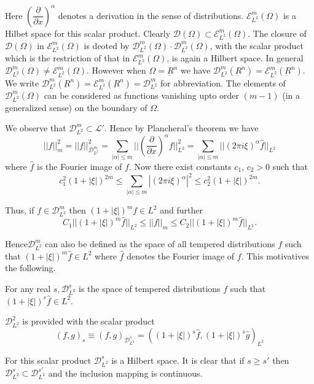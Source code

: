 Here $\left(\dfrac{\partial} {\partial x}\right)^\alpha$ denotes a
derivation in the sense of
distributions. $\mathscr{E}^m_{L^2}(\Omega)$ is a Hilbet 
space for this scalar product. Clearly $\mathscr{D} (\Omega) \subset
\mathscr{E}^m_{L^2} (\Omega)$. The closure of $\mathscr{D} (\Omega)$
in $\mathscr{E}^m_{L^2}(\Omega)$ is deoted by
$\mathscr{D}^m_{L^2}(\Omega) \cdot \mathscr{D}^m_{L^2}(\Omega)$, with the
scalar product which is the restriction of that in
$\mathscr{E}^m_{L^2}(\Omega)$, is again a Hilbert space. In general
$\mathscr{D}^m_{L^2}(\Omega) \neq
\mathscr{E}^m_{L^2}(\Omega)$. However when $\Omega = \underbar{R}^n$
we have $\mathscr{D}^m_{L^2} (\underbar{R}^n) =
\mathscr{E}^m_{L^2}(\underbar{R}^n)$. We write
$\mathscr{D}^m_{L^2}(\underbar{R}^n) =
\mathscr{E}^m_{L^2}(\underbar{R}^n) = \mathscr{D}^m_{L^2}$ for
abbreviation. The elements of $\mathscr{D}^m_{L^2}(\Omega)$ can be
considered as functions vanishing upto order $(m-1)$ (in a generalized
sense) on the boundary of $\Omega$.  
  
 We observe that  $\mathscr{D}^m_{L^2} \subset \mathscr{L'}$. Hence by
 Plancheral's theorem we have  
 $$
 || f ||^2_m = || f ||^2_{\mathscr{D}^m_{L^2}} =
 \sum\limits_{|\alpha|\leq m} || \left(\frac{\partial}{\partial
   x}\right)^\alpha  f||^2_{L^2}  = \sum_{|\alpha|\leq m} || (2 \pi i
 \xi)^\alpha \hat{f}||_{L^2}  
 $$
 where $\hat{f}$ is the Fourier image of $f$. Now there exist
 constants $c_1$, $c_2 > 0$ such that  
 $$
 c^2_1 (1 + |\xi |)^{2m} \leq \sum_{|\alpha|\leq m}| (2\pi i \xi )^\alpha
 |^2\leq c^2_2 (1 + |\xi |)^{2m}. 
 $$

Thus, if $f \in\mathscr{D}^m_{L^2}$ then $(1 + |\xi |)^m f
\in L^2$ and further  
$$
C_1||(1+|\xi|)^m \hat{f} ||_{L^2} \leq ||f||_m \leq  C_2 || (1 + |\xi|)^m
\hat{f}||_{L^2}.  
$$

Hence\pageoriginale $\mathscr{D}^m_{L^2} $ can also be defined as the
space of all 
tempered distributions $f$ such that $(1+|\xi|)^m \hat{f}
\in L^2$ where $\hat{f}$ denotes the Fourier image of
$f$. This motivatives the following.  

\begin{defi*}
For any real $s, \mathscr{D}^s_{L^2}$ is the space of tempered
distributions $f$ such that $(1+|\xi|)^s \hat{f} \in L^2$.  
 
 $\mathscr{D}^2 _{L^2}$ is provided with the scalar product 
 \begin{equation}
( f, g )_s \equiv (f, g )_{\mathscr{D}^s_{L^2}} = ((1 + |\xi |)^s
   \hat{f}, (1 + |\xi|)^s \hat{g})_{L^2}\tag{1.5}\label{chap5-eq1.5} 
 \end{equation} 

 For this scalar product $\mathscr{D}^s_{L^2}$ is a Hilbert space. It
 is clear that if $s \geq s'$ then $\mathscr{D}^s_{L^2} \subset
 \mathscr{D}^{s'}_{L^2}$ and the inclusion mapping is continuous.  
 \end{defi*}

